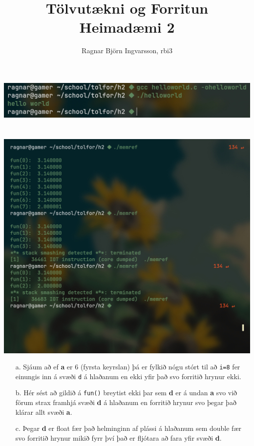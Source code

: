 \documentclass{article}
\title{Tölvutækni og Forritun Heimadæmi 2}
\author{Ragnar Björn Ingvarsson, rbi3}
\begin{document}
	
	\maketitle
	
	\section{}
	\includegraphics[scale=0.350]{helloworld.png}

	\section{}
	\begin{center}
	\includegraphics[scale=0.200]{stacksmash.png}
	\end{center}
	\begin{itemize}
		\item[a.] Sjáum að ef \textbf{a} er $6$ (fyrsta keyrslan) þá 
			er fylkið nógu stórt til að \texttt{i=8} fer einungis inn 
			á svæði \texttt{d} á hlaðanum en ekki yfir það svo forritið 
			hrynur ekki.
		\item[b.] Hér sést að gildið á \texttt{fun()} breytist ekki þar 
			sem \textbf{d} er á undan \textbf{a} svo við förum strax 
			framhjá svæði \textbf{d} á hlaðanum en forritið hrynur svo 
			þegar það klárar allt svæði \textbf{a}.
		\item[c.] Þegar \textbf{d} er float fær það helminginn af plássi 
			á hlaðanum sem double fær svo forritið hrynur mikið fyrr 
			því það er fljótara að fara yfir svæði \textbf{d}.
	\end{itemize}
\end{document}
